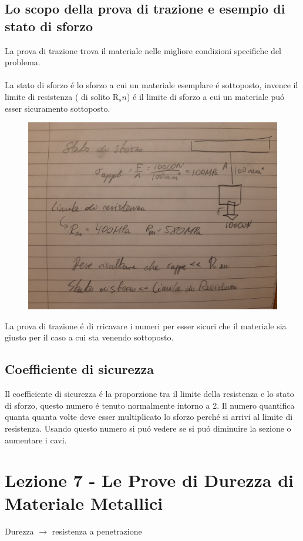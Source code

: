 \documentclass{article}
\begin{document}
{        \subsection{Lo scopo della prova di trazione e esempio di stato di sforzo}
            La prova di trazione trova il materiale nelle migliore condizioni specifiche del problema.\\ \\
            La stato di sforzo \'e lo sforzo a cui un materiale esemplare \'e sottoposto, invence il limite di resistenza ( di solito R$_sn$) \'e il limite di sforzo a cui un materiale pu\'o esser sicuramento sottoposto.
            \begin{figure}[!h]
                    \centering
                    \includegraphics[width=.85\linewidth]{Esempio di Esercizio Limite di Sforzo.jpg}
            \end{figure}
            La prova di trazione \'e di rricavare i numeri per esser sicuri che il materiale sia giusto per il caso a cui sta venendo sottoposto.
        \subsection{Coefficiente di sicurezza}
            Il coefficiente di sicurezza \'e la proporzione tra il limite della resistenza e lo stato di sforzo, questo numero \'e tenuto normalmente intorno a 2. Il numero quantifica quanta quanta volte deve esser multiplicato lo sforzo perch\'e si arrivi al limite di resistenza. Usando questo numero si pu\'o vedere se si pu\'o diminuire la sezione o aumentare i cavi. 
    \section{Lezione 7 - Le Prove di Durezza di Materiale Metallici}
        Durezza $\rightarrow$ resistenza a penetrazione
}
\end{document}
